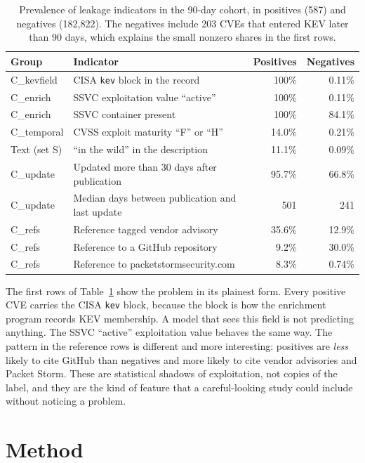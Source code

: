 \documentclass[conference,a4paper]{IEEEtran}
\begin{document}
\begin{table}[t]
\centering
\caption{Prevalence of leakage indicators in the 90-day cohort, in positives (587) and negatives (182{,}822). The negatives include 203 CVEs that entered KEV later than 90 days, which explains the small nonzero shares in the first rows.}
\label{tab:groups}
\small
\begin{tabular}{llrr}
\toprule
Group & Indicator & Positives & Negatives \\
\midrule
C\_kevfield & CISA \texttt{kev} block in the record & 100\% & 0.11\% \\
C\_enrich & SSVC exploitation value ``active'' & 100\% & 0.11\% \\
C\_enrich & SSVC container present & 100\% & 84.1\% \\
C\_temporal & CVSS exploit maturity ``F'' or ``H'' & 14.0\% & 0.21\% \\
Text (set S) & ``in the wild'' in the description & 11.1\% & 0.09\% \\
C\_update & Updated more than 30 days after publication & 95.7\% & 66.8\% \\
C\_update & Median days between publication and last update & 501 & 241 \\
C\_refs & Reference tagged vendor advisory & 35.6\% & 12.9\% \\
C\_refs & Reference to a GitHub repository & 9.2\% & 30.0\% \\
C\_refs & Reference to packetstormsecurity.com & 8.3\% & 0.74\% \\
\bottomrule
\end{tabular}
\end{table}

The first rows of Table~\ref{tab:groups} show the problem in its plainest form. Every positive CVE carries the CISA \texttt{kev} block, because the block is how the enrichment program records KEV membership. A model that sees this field is not predicting anything. The SSVC ``active'' exploitation value behaves the same way. The pattern in the reference rows is different and more interesting: positives are \emph{less} likely to cite GitHub than negatives and more likely to cite vendor advisories and Packet Storm. These are statistical shadows of exploitation, not copies of the label, and they are the kind of feature that a careful-looking study could include without noticing a problem.

\section{Method}
\end{document}
